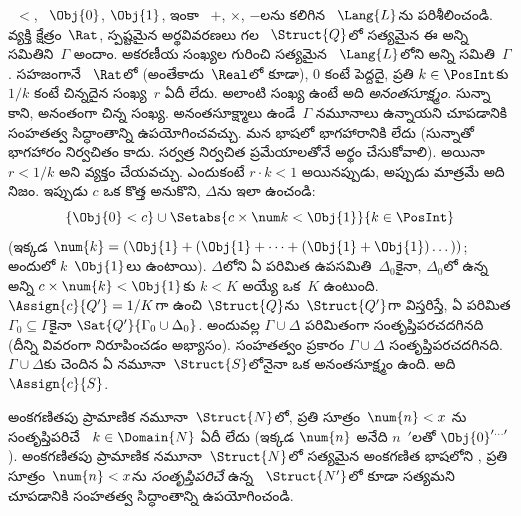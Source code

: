 \documentclass[../../../include/open-logic-section]{subfiles}
\begin{document}
{\begin{ex}
~$<$, ~$\Obj{0}$, $\Obj{1}$, ఇంకా
~$+$, $\times$, $-$లను కలిగిన ~$\Lang{L}$ను
పరిశీలించండి. వ్యక్తి క్షేత్రం~$\Rat$, స్పష్టమైన అర్థవివరణలు గల
~$\Struct{Q}$లో సత్యమైన ఈ  అన్ని
 సమితిని~$\Gamma$ అందాం. అకరణీయ సంఖ్యల గురించి సత్యమైన
~$\Lang{L}$లోని అన్ని  సమితి~$\Gamma$. సహజంగానే
~$\Rat$లో (అంతేకాదు~$\Real$లో కూడా), $0$ కంటే పెద్దదై, ప్రతి
$k \in \PosInt$కు $1/k$ కంటే చిన్నదైన సంఖ్య~$r$ ఏదీ లేదు. అలాంటి
సంఖ్య ఉంటే అది
\emph{అనంతసూక్ష్మం.} సున్నా కాని, అనంతంగా చిన్న సంఖ్య. అనంతసూక్ష్మాలు
ఉండే~$\Gamma$ నమూనాలు ఉన్నాయని చూపడానికి సంహతత్వ సిద్ధాంతాన్ని
ఉపయోగించవచ్చు. మన భాషలో భాగహారానికి  లేదు (సున్నాతో
భాగహారం నిర్వచితం కాదు.  సర్వత్ర నిర్వచిత ప్రమేయాలతోనే
అర్థం చేసుకోవాలి). అయినా $r < 1/k$ అని వ్యక్తం చేయవచ్చు. ఎందుకంటే
$r \cdot k < 1$ అయినప్పుడు, అప్పుడు మాత్రమే అది నిజం. ఇప్పుడు $c$ ఒక
కొత్త  అనుకొని, $\Delta$ను ఇలా ఉంచండి:
\[
\{\Obj{0} < c\}
\cup \Setabs{ c \times \num k < \Obj{1} }{k \in \PosInt}
\]
(ఇక్కడ $\num{k} = (\Obj{1} + (\Obj{1} + \dots + (\Obj{1} +
\Obj{1})\dots))$; అందులో $k$~$\Obj{1}$లు ఉంటాయి). $\Delta$లోని ఏ
పరిమిత ఉపసమితి~$\Delta_0$కైనా, $\Delta_0$లో ఉన్న అన్ని
 $c \times \num{k} < \Obj{1}$కు $k < K$ అయ్యే ఒక~$K$
ఉంటుంది. $\Assign{c}{Q'} = 1/K$గా ఉంచి $\Struct{Q}$ను~$\Struct{Q'}$గా
విస్తరిస్తే, ఏ పరిమిత $\Gamma_0 \subseteq \Gamma$కైనా
$\Sat{Q'}{\Gamma_0 \cup \Delta_0}$. అందువల్ల $\Gamma \cup \Delta$
పరిమితంగా సంతృప్తిపరచదగినది (దీన్ని వివరంగా నిరూపించడం అభ్యాసం).
సంహతత్వం ప్రకారం $\Gamma \cup \Delta$ సంతృప్తిపరచదగినది. $\Gamma
\cup \Delta$కు చెందిన ఏ నమూనా~$\Struct{S}$లోనైనా ఒక అనంతసూక్ష్మం ఉంది.
అది~$\Assign{c}{S}$.
\end{ex}
}{}

\begin{prob}
అంకగణితపు ప్రామాణిక నమూనా~$\Struct{N}$లో, ప్రతి సూత్రం~$\num{n} < x$
ను సంతృప్తిపరిచే ~$k \in \Domain{N}$ ఏదీ లేదు (ఇక్కడ
$\num{n}$ అనేది $n$~$\prime$లతో $\Obj{0}^{\prime\dots\prime}$).
అంకగణితపు ప్రామాణిక నమూనా~$\Struct{N}$లో సత్యమైన అంకగణిత భాషలోని
, ప్రతి సూత్రం~$\num{n} < x$ను
\emph{సంతృప్తిపరిచే}  ఉన్న ~$\Struct{N'}$లో
కూడా సత్యమని చూపడానికి సంహతత్వ సిద్ధాంతాన్ని ఉపయోగించండి.
\end{prob}
\tagendprob
\end{document}

